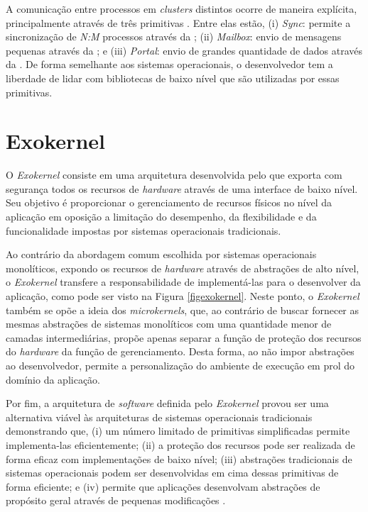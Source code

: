 \documentclass[
	12pt,				%
	openright,			%
	twoside,			%
	a4paper,			%
	english,			%
	brazil,				%
	]{abntex2}
\begin{document}
        A comunicação entre processos em \textit{clusters} distintos ocorre
        de maneira explícita, principalmente  através de três primitivas \ipc.
        Entre elas estão,
        (i) \textit{Sync}: permite a sincronização de \textit{N:M} processos através da \cnoc;
        (ii) \textit{Mailbox}: envio de mensagens pequenas através da \dnoc; e
        (iii) \textit{Portal}: envio de grandes quantidade de dados através da \dnoc.
        De forma semelhante aos sistemas operacionais, o desenvolvedor tem a
        liberdade de lidar com bibliotecas de baixo nível que são utilizadas
        por essas primitivas.
    
    \section{Exokernel}
    \label{sec:exokernel}
    
        O \textit{Exokernel} consiste em uma arquitetura desenvolvida
        pelo \unimit que exporta com segurança todos os
        recursos de \textit{hardware} através de uma interface de baixo nível.
        Seu objetivo é proporcionar o gerenciamento de recursos físicos
        no nível da aplicação em oposição a limitação do desempenho, da
        flexibilidade e da funcionalidade impostas por sistemas operacionais 
        tradicionais.

        Ao contrário da abordagem comum escolhida por sistemas operacionais
        monolíticos, expondo os recursos de \textit{hardware} através de abstrações
        de alto nível, o \textit{Exokernel} transfere a responsabilidade de
        implementá-las para o desenvolver da aplicação, como pode ser visto
        na Figura \ref{figexokernel}.
        Neste ponto, o \textit{Exokernel} também se opõe a ideia dos 
        \textit{microkernels}, que, ao contrário de buscar fornecer as
        mesmas abstrações de sistemas monolíticos com uma quantidade menor
        de camadas intermediárias, propõe apenas separar a função de proteção
        dos recursos do \textit{hardware} da função de gerenciamento.
        Desta forma, ao não impor abstrações ao desenvolvedor, permite a
        personalização do ambiente de execução em prol do domínio da aplicação.
                
        Por fim, a arquitetura de \textit{software} definida pelo \textit{Exokernel}
        provou ser uma alternativa viável às arquiteturas de sistemas
        operacionais tradicionais demonstrando que, 
        (i) um número limitado de primitivas simplificadas permite 
        implementa-las eficientemente; 
        (ii) a proteção dos recursos pode ser realizada de forma eficaz com
        implementações de baixo nível; (iii) abstrações tradicionais de
        sistemas operacionais podem ser desenvolvidas em cima dessas
        primitivas de forma eficiente; e 
        (iv) permite que aplicações desenvolvam abstrações de propósito
        geral através de pequenas modificações \cite{engler_exokernel:_1995}.
\end{document}
